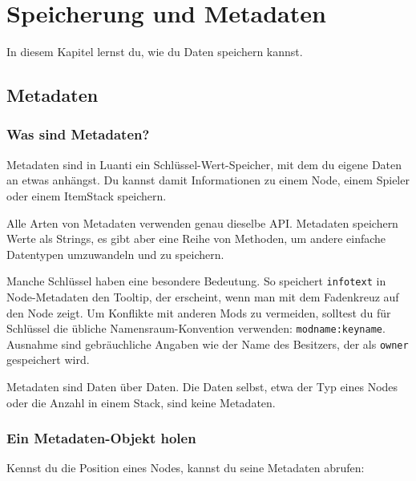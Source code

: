 \chapter{Speicherung und Metadaten}
\label{ch:map/storage}

In diesem Kapitel lernst du, wie du Daten speichern kannst.

\section{Metadaten}\label{metadaten}

\subsection{Was sind Metadaten?}\label{was-sind-metadaten}

Metadaten sind in Luanti ein
Schlüssel-Wert-Speicher, mit dem du eigene Daten an etwas anhängst. Du
kannst damit Informationen zu einem Node, einem Spieler oder einem
ItemStack speichern.

Alle Arten von Metadaten verwenden genau dieselbe API. Metadaten
speichern Werte als Strings, es gibt aber eine Reihe von Methoden, um
andere einfache Datentypen umzuwandeln und zu speichern.

Manche Schlüssel haben eine besondere Bedeutung. So speichert
\texttt{infotext} in Node-Metadaten den Tooltip, der erscheint, wenn man
mit dem Fadenkreuz auf den Node zeigt. Um Konflikte mit anderen Mods zu
vermeiden, solltest du für Schlüssel die übliche Namensraum-Konvention
verwenden: \texttt{modname:keyname}. Ausnahme sind gebräuchliche Angaben
wie der Name des Besitzers, der als \texttt{owner} gespeichert wird.

Metadaten sind Daten über Daten. Die Daten selbst, etwa der Typ eines
Nodes oder die Anzahl in einem Stack, sind keine Metadaten.

\subsection{Ein Metadaten-Objekt
holen}\label{ein-metadaten-objekt-holen}

Kennst du die Position eines Nodes, kannst du seine Metadaten abrufen:

\begin{Shaded}
\begin{Highlighting}[]
  \OperatorTok{=} \OperatorTok{(\{}  \OperatorTok{=} \OperatorTok{,}  \OperatorTok{=} \OperatorTok{,}  \OperatorTok{=}  \OperatorTok{\})}
\end{Highlighting}
\end{Shaded}

